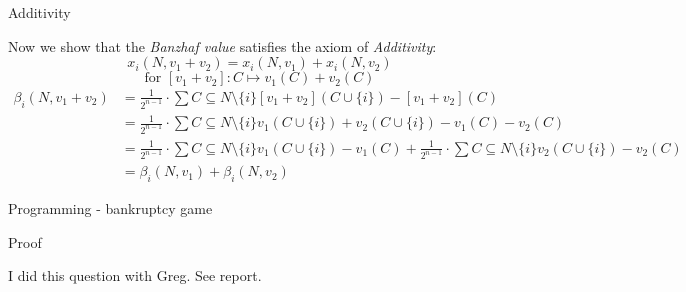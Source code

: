 \documentclass[12pt]{article}
\newenvironment{question}[2][Question]{\begin{trivlist}
\item[\hskip \labelsep {\bfseries #1}\hskip \labelsep {\bfseries #2.}]}{\end{trivlist}}
\newenvironment{answer}[2][Answer]{\begin{trivlist}
\item[\hskip \labelsep {\bfseries #1}\hskip \labelsep {\bfseries #2:}]}{\end{trivlist}}
\begin{document}
\begin{answer}{d)}{Additivity}

Now we show that the \textit{Banzhaf value} satisfies the axiom of \textit{Additivity}:
$$x_i(N,v_1 + v_2)=x_i(N,v_1)+x_i(N,v_2)$$
$$\text{for } [v_1 + v_2]:C \mapsto v_1(C) + v_2(C)$$
\begin{align*}
\beta_i(N,v_1+v_2)&=\frac{1}{2^{n-1}}\cdot \sum{C \subseteq N \setminus \{i\}}{}{[v_1+v_2](C \cup \{i\}) - [v_1+v_2](C)} \\
&=\frac{1}{2^{n-1}}\cdot \sum{C \subseteq N \setminus \{i\}}{}{v_1(C \cup \{i\})+v_2(C \cup \{i\}) - v_1(C) -v_2(C)} \\
&=\frac{1}{2^{n-1}}\cdot \sum{C \subseteq N \setminus \{i\}}{}{v_1(C \cup \{i\}) - v_1(C)} + \frac{1}{2^{n-1}}\cdot \sum{C \subseteq N \setminus \{i\}}{}{v_2(C \cup \{i\}) - v_2(C)} \\
&=\beta_i(N,v_1)+\beta_i(N,v_2)
\end{align*}

\end{answer}
\begin{question}{3}
Programming - bankruptcy game
\end{question}
\begin{answer}{a)}{Proof}

I did this question with Greg. See report.
\end{answer}
\end{document}
